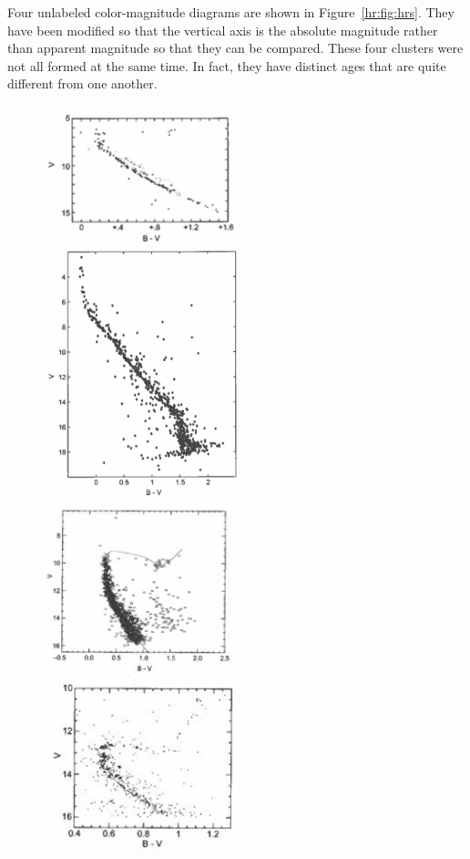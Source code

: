 Four unlabeled color-magnitude diagrams are shown in Figure\ \ref{hr:fig:hrs}. They have been modified so that the vertical axis is the absolute magnitude rather than apparent magnitude so that they can be compared. These four clusters were not all formed at the same time. In fact, they have distinct ages that are quite different from one another.

\begin{figure}
	\includegraphics[width=0.5\textwidth]{hr_diagram/mystery-hr-1}
	\includegraphics[width=0.5\textwidth]{hr_diagram/mystery-hr-2}
	\includegraphics[width=0.5\textwidth]{hr_diagram/mystery-hr-3}
	\includegraphics[width=0.5\textwidth]{hr_diagram/mystery-hr-4}

\end{figure}
